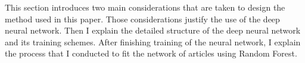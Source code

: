 This section introduces two main considerations that are taken to design the method used in this paper.
Those considerations justify the use of the deep neural network.
Then I explain the detailed structure of the deep neural network and its training schemes.
After finishing training of the neural network, I explain the process that I conducted to fit the network of articles using Random Forest.
 
 

